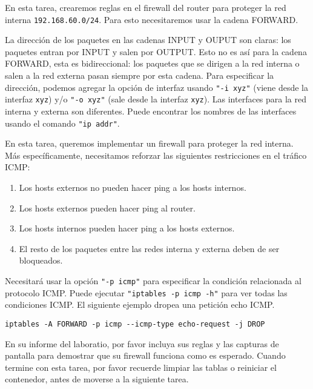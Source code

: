 En esta tarea, crearemos reglas en el firewall del router para proteger la red interna \texttt{192.168.60.0/24}. Para esto necesitaremos usar la cadena FORWARD.

La dirección de los paquetes en las cadenas INPUT y OUPUT son claras:
los paquetes entran por INPUT y salen por OUTPUT.
Esto no es así para la cadena FORWARD, esta es bidireccional: los paquetes que se dirigen a la red interna o salen a la red externa pasan siempre por esta cadena. Para especificar la dirección, podemos agregar la opción de interfaz usando \texttt{"-i xyz"} (viene desde la interfaz \texttt{xyz}) y/o \texttt{"-o xyz"} (sale desde la interfaz \texttt{xyz}). Las interfaces para la red interna y externa son diferentes.
Puede encontrar los nombres de las interfaces usando el comando \texttt{"ip addr"}.

En esta tarea, queremos implementar un firewall para proteger la red interna. Más específicamente, necesitamos reforzar las siguientes restricciones en el tráfico ICMP:


\begin{enumerate}[noitemsep]
  \item	Los hosts externos no pueden hacer ping a los hosts internos.
  \item	Los hosts externos pueden hacer ping al router.
  \item	Los hosts internos pueden hacer ping a los hosts externos.
  \item	El resto de los paquetes entre las redes interna y externa deben de ser bloqueados.
\end{enumerate}

Necesitará usar la opción \texttt{"-p icmp"} para especificar la condición relacionada al protocolo ICMP. Puede ejecutar \texttt{"iptables -p icmp -h"} para ver todas las condiciones ICMP. El siguiente ejemplo dropea una petición echo ICMP.


\begin{lstlisting}
iptables -A FORWARD -p icmp --icmp-type echo-request -j DROP
\end{lstlisting}

En su informe del laboratio, por favor incluya sus reglas y las capturas de pantalla para demostrar que su firewall funciona como es esperado.
Cuando termine con esta tarea, por favor recuerde limpiar las tablas o reiniciar el contenedor, antes de moverse a la siguiente tarea.

